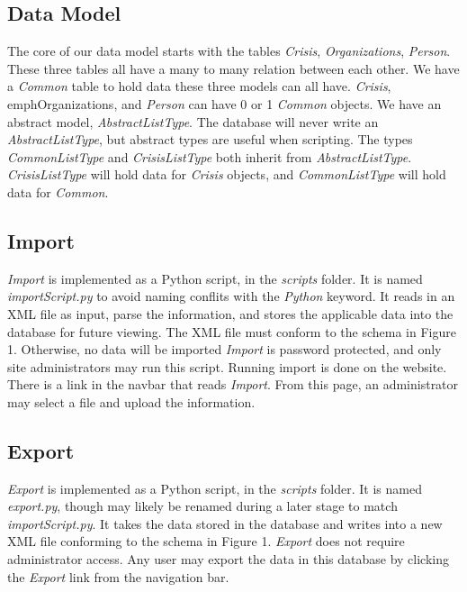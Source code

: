 \documentclass[12pt]{report}
\begin{document}
\subsection*{Data Model}
The core of our data model starts with the tables \emph{Crisis}, \emph{Organizations}, \emph{Person}.
These three tables all have a many to many relation between each other.
We have a \emph{Common} table to hold data these three models can all have.
\emph{Crisis}, emph{Organizations}, and \emph{Person} can have 0 or 1 \emph{Common} objects.
We have an abstract model, \emph{AbstractListType}.
The database will never write an \emph{AbstractListType}, but abstract types are useful when scripting.
The types \emph{CommonListType} and \emph{CrisisListType} both inherit from \emph{AbstractListType}.
\emph{CrisisListType} will hold data for \emph{Crisis} objects, and \emph{CommonListType} will hold data for \emph{Common}.

\subsection*{Import}
\emph{Import} is implemented as a Python script, in the \emph{scripts} folder.
It is named \emph{importScript.py} to avoid naming conflits with the \emph{Python} keyword.
It reads in an XML file as input, parse the information, and stores the applicable data into the database for future viewing.
The XML file must conform to the schema in Figure 1.
Otherwise, no data will be imported
\emph{Import} is password protected, and only site administrators may run this script.
Running import is done on the website.
There is a link in the navbar that reads \emph{Import}.
From this page, an administrator may select a file and upload the information.

\subsection*{Export}
\emph{Export} is implemented as a Python script, in the \emph{scripts} folder.
It is named \emph{export.py}, though may likely be renamed during a later stage to match \emph{importScript.py}.
It takes the data stored in the database and writes into a new XML file conforming to the schema in Figure 1.
\emph{Export} does not require administrator access.
Any user may export the data in this database by clicking the \emph{Export} link from the navigation bar.
\end{document}

